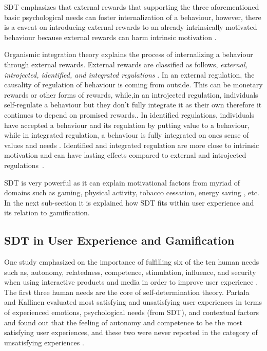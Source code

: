 \documentclass{sig-alternate}
\begin{document}
SDT emphasizes that external rewards that supporting the three aforementioned basic psychological needs can foster internalization of a behaviour, however, there is a caveat on introducing external rewards to an already intrinsically motivated behaviour because external rewards can harm intrinsic motivation \cite{ryan2000:self}.

Organismic integration theory explains the process of internalizing a behaviour through external rewards. External rewards are classified as follows, \emph{external, introjected, identified, and integrated regulations} \cite{ryan2000:self,lee2015:relating}. In an external regulation, the causality of  regulation of behaviour is coming from outside. This can be monetary rewards or other forms of rewards, while,in an introjected regulation, individuals self-regulate a behaviour but they don't fully integrate it as their own therefore it continues to depend on promised rewards.\cite {lee2015:relating}. In identified  regulations, individuals have accepted a behaviour and its regulation by putting value to a behaviour, while in integrated regulation,  a behaviour is fully integrated on ones sense of values and needs \cite{lee2015:relating}. Identified and integrated regulation are more close to intrinsic motivation and can have lasting effects compared to external and introjected regulations~\cite{ryan2000intrinsic}.

SDT is very powerful as it can explain motivational factors from myriad of domains such as gaming\cite{ryan2006:motivationalpull}, physical activity\cite{power2011:obesity}, tobacco cessation\cite{williams2006:testing}, energy saving \cite{webb2013:self}, etc. In the next sub-section it is explained how SDT fits within user experience and its relation to gamification.  
\subsection{SDT in User Experience and Gamification}
One study emphasized on the importance of fulfilling six of the ten human needs such as, autonomy, relatedness, competence, stimulation, influence, and security when using interactive products and media in order to improve user experience \cite{wiklund2009:needs}. The first three human needs are the core of self-determination theory. Partala and Kallinen \cite{partala2012:understanding} evaluated most satisfying and unsatisfying user experiences in terms of experienced emotions, psychological needs (from SDT), and contextual factors and found out that the feeling of autonomy and competence to be the most satisfying user experiences, and these two were never reported in the category of unsatisfying experiences \cite{partala2012:understanding}.
\end{document}
